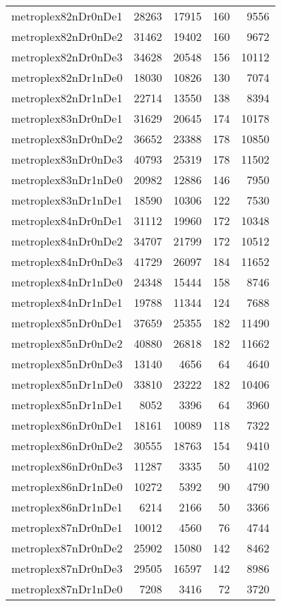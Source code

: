 \begin{longtable}{lrrrr}
metroplex82nDr0nDe1 & 28263 & 17915 & 160 & 9556 \\
metroplex82nDr0nDe2 & 31462 & 19402 & 160 & 9672 \\
metroplex82nDr0nDe3 & 34628 & 20548 & 156 & 10112 \\
metroplex82nDr1nDe0 & 18030 & 10826 & 130 & 7074 \\
metroplex82nDr1nDe1 & 22714 & 13550 & 138 & 8394 \\
metroplex83nDr0nDe1 & 31629 & 20645 & 174 & 10178 \\
metroplex83nDr0nDe2 & 36652 & 23388 & 178 & 10850 \\
metroplex83nDr0nDe3 & 40793 & 25319 & 178 & 11502 \\
metroplex83nDr1nDe0 & 20982 & 12886 & 146 & 7950 \\
metroplex83nDr1nDe1 & 18590 & 10306 & 122 & 7530 \\
metroplex84nDr0nDe1 & 31112 & 19960 & 172 & 10348 \\
metroplex84nDr0nDe2 & 34707 & 21799 & 172 & 10512 \\
metroplex84nDr0nDe3 & 41729 & 26097 & 184 & 11652 \\
metroplex84nDr1nDe0 & 24348 & 15444 & 158 & 8746 \\
metroplex84nDr1nDe1 & 19788 & 11344 & 124 & 7688 \\
metroplex85nDr0nDe1 & 37659 & 25355 & 182 & 11490 \\
metroplex85nDr0nDe2 & 40880 & 26818 & 182 & 11662 \\
metroplex85nDr0nDe3 & 13140 & 4656 & 64 & 4640 \\
metroplex85nDr1nDe0 & 33810 & 23222 & 182 & 10406 \\
metroplex85nDr1nDe1 & 8052 & 3396 & 64 & 3960 \\
metroplex86nDr0nDe1 & 18161 & 10089 & 118 & 7322 \\
metroplex86nDr0nDe2 & 30555 & 18763 & 154 & 9410 \\
metroplex86nDr0nDe3 & 11287 & 3335 & 50 & 4102 \\
metroplex86nDr1nDe0 & 10272 & 5392 & 90 & 4790 \\
metroplex86nDr1nDe1 & 6214 & 2166 & 50 & 3366 \\
metroplex87nDr0nDe1 & 10012 & 4560 & 76 & 4744 \\
metroplex87nDr0nDe2 & 25902 & 15080 & 142 & 8462 \\
metroplex87nDr0nDe3 & 29505 & 16597 & 142 & 8986 \\
metroplex87nDr1nDe0 & 7208 & 3416 & 72 & 3720 \\

\end{longtable}
